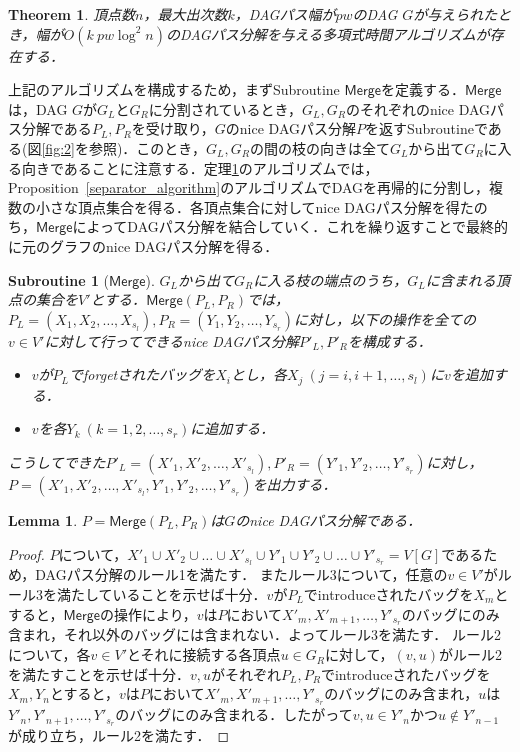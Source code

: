 \documentclass[master]{kuisthesis}		%
\theoremstyle{plain}
\newtheorem{theorem}{Theorem}
\newtheorem{subroutine}{Subroutine}
\newtheorem{lemma}{Lemma}
\theoremstyle{definition}
\begin{document}
\begin{theorem}\label{approximation}
    頂点数$n$，最大出次数$k$，DAGパス幅が$pw$のDAG $G$が与えられたとき，幅が$O(k \ pw \log ^2 n)$のDAGパス分解を与える多項式時間アルゴリズムが存在する．
\end{theorem}


上記のアルゴリズムを構成するため，まずSubroutine $\mathsf{Merge}$を定義する．$\mathsf{Merge}$は，DAG $G$が$G_L$と$G_R$に分割されているとき，$G_L, G_R$のそれぞれのnice DAGパス分解である$P_L, P_R$を受け取り，$G$のnice DAGパス分解$P$を返すSubroutineである(図\ref{fig:2}を参照)．このとき，$G_L, G_R$の間の枝の向きは全て$G_L$から出て$G_R$に入る向きであることに注意する．定理\ref{approximation}のアルゴリズムでは，Proposition~\ref{separator_algorithm}のアルゴリズムでDAGを再帰的に分割し，複数の小さな頂点集合を得る．各頂点集合に対してnice DAGパス分解を得たのち，$\mathsf{Merge}$によってDAGパス分解を結合していく．これを繰り返すことで最終的に元のグラフのnice DAGパス分解を得る．


\begin{subroutine}[$\mathsf{Merge}$]
    $G_L$から出て$G_R$に入る枝の端点のうち，$G_L$に含まれる頂点の集合を$V'$とする．$\mathsf{Merge}(P_L, P_R)$では，$P_L=(X_1, X_2, \dots , X_{s_l}), P_R=(Y_1, Y_2, \dots , Y_{s_r})$に対し，以下の操作を全ての$v \in V'$に対して行ってできるnice DAGパス分解$P'_L, P'_R$を構成する．
    \begin{itemize}
      \item $v$が$P_L$でforgetされたバッグを$X_i$とし，各$X_j\ (j=i, i+1, \dots , s_l)$に$v$を追加する．
      \item $v$を各$Y_k\ (k=1, 2, \dots , s_r)$に追加する．
    \end{itemize}
    こうしてできた$P'_L=(X'_1, X'_2, \dots , X'_{s_l}), P'_R=(Y'_1, Y'_2, \dots , Y'_{s_r})$に対し，$P=(X'_1, X'_2, \dots , X'_{s_l}, Y'_1, Y'_2, \dots , Y'_{s_r})$を出力する．
\end{subroutine}

\begin{lemma}
    $P=\mathsf{Merge}(P_L, P_R)$は$G$のnice DAGパス分解である．
\end{lemma}

\begin{proof} 
$P$について，$X'_1 \cup X'_2 \cup \dots \cup X'_{s_l} \cup Y'_1 \cup Y'_2 \cup \dots \cup Y'_{s_r} = V[G]$であるため，DAGパス分解のルール1を満たす．
またルール3について，任意の$v \in V'$がルール3を満たしていることを示せば十分．$v$が$P_L$でintroduceされたバッグを$X_m$とすると，$\mathsf{Merge}$の操作により，$v$は$P$において$X'_m, X'_{m+1}, \dots , Y'_{s_r}$のバッグにのみ含まれ，それ以外のバッグには含まれない．よってルール3を満たす．
ルール2について，各$v \in V'$とそれに接続する各頂点$u \in G_R$に対して，$(v, u)$がルール2を満たすことを示せば十分．$v, u$がそれぞれ$P_L, P_R$でintroduceされたバッグを$X_m, Y_n$とすると，$v$は$P$において$X'_m, X'_{m+1}, \dots , Y'_{s_r}$のバッグにのみ含まれ，$u$は$Y'_n, Y'_{n+1}, \dots , Y'_{s_r}$のバッグにのみ含まれる．したがって$v, u \in Y'_n$かつ$u \notin Y'_{n-1}$が成り立ち，ルール2を満たす．
\end{proof} 
\end{document}
